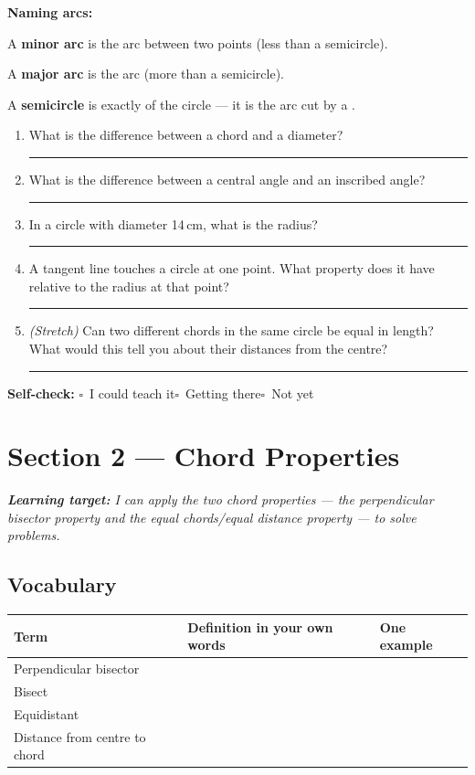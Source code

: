 \documentclass[11pt, a4paper]{article}
\newcommand{\blank}[1]{\underline{\hspace{#1}}}
\newcommand{\answerline}{\par\vspace{0.45cm}\noindent\rule{\linewidth}{0.4pt}\par\vspace{0.1cm}}
\newcommand{\selfcheck}{\par\smallskip\noindent\textbf{Self-check:}
  $\square$~I could teach it\quad$\square$~Getting there\quad$\square$~Not yet\smallskip}
\begin{document}
\vspace{6pt}
\textbf{Naming arcs:}

A \textbf{minor arc} is the \blank{3cm} arc between two points (less than a semicircle).

A \textbf{major arc} is the \blank{3cm} arc (more than a semicircle).

A \textbf{semicircle} is exactly \blank{2.5cm} of the circle --- it is the arc cut by a \blank{3cm}.

\begin{tcolorbox}[retrieval]
\begin{enumerate}[leftmargin=*, itemsep=10pt]
  \item What is the difference between a chord and a diameter? \answerline
  \item What is the difference between a central angle and an inscribed angle? \answerline
  \item In a circle with diameter 14\,cm, what is the radius? \answerline
  \item A tangent line touches a circle at one point. What property does it have relative to the radius at that point? \answerline
  \item \textit{(Stretch)} Can two different chords in the same circle be equal in length? What would this tell you about their distances from the centre? \answerline
\end{enumerate}
\selfcheck
\end{tcolorbox}

\clearpage

\section{Section 2 --- Chord Properties}

\begin{tcolorbox}[learningtarget]
\small\textit{\textbf{Learning target:} I can apply the two chord properties --- the perpendicular bisector property and the equal chords/equal distance property --- to solve problems.}
\end{tcolorbox}

\subsection{Vocabulary}

\renewcommand{\arraystretch}{1.9}
\begin{tabularx}{\linewidth}{|p{4.2cm}|X|X|}
\hline
\rowcolor{accentlight}\textbf{Term} & \textbf{Definition in your own words} & \textbf{One example} \\
\hline
Perpendicular bisector & & \\ \hline
Bisect               & & \\ \hline
Equidistant          & & \\ \hline
Distance from centre to chord & & \\ \hline
\end{tabularx}
\renewcommand{\arraystretch}{1}
\end{document}
